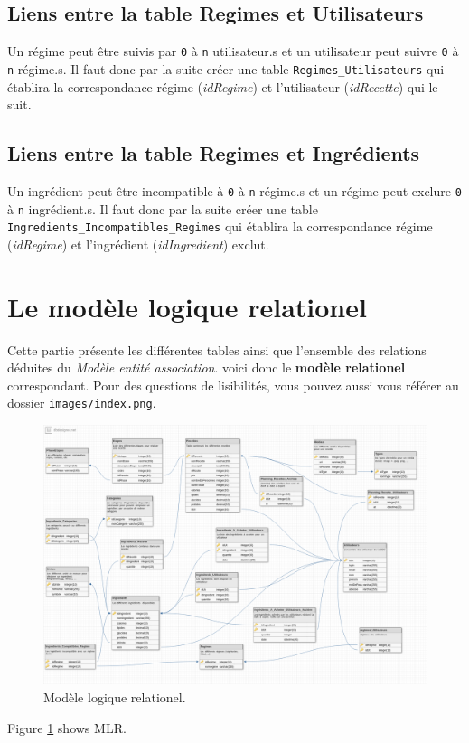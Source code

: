 \subsection{Liens entre la table Regimes et Utilisateurs}
Un régime peut être suivis par \texttt{0} à \texttt{n} utilisateur.s et un utilisateur peut suivre \texttt{0} à \texttt{n} régime.s. Il faut donc par la suite créer une table \texttt{Regimes\_Utilisateurs} qui établira la correspondance régime (\textit{idRegime}) et l'utilisateur (\textit{idRecette}) qui le suit.

\subsection{Liens entre la table Regimes et Ingrédients}
Un ingrédient peut être incompatible à \texttt{0} à \texttt{n} régime.s et un régime peut exclure \texttt{0} à \texttt{n} ingrédient.s. Il faut donc par la suite créer une table \texttt{Ingredients\_Incompatibles\_Regimes} qui établira la correspondance régime (\textit{idRegime}) et l'ingrédient (\textit{idIngredient}) exclut.

\section{Le modèle logique relationel}
Cette partie présente les différentes tables ainsi que l'ensemble des relations déduites du \textit{Modèle entité association}. voici donc le \textbf{modèle relationel} correspondant. Pour des questions de lisibilités, vous pouvez aussi vous référer au dossier \texttt{images/index.png}.

\begin{figure}
    \includegraphics[scale=0.3]{images/index.png}
    \caption{Modèle logique relationel.}
    \label{fig:modele E/R}
\end{figure}
Figure \ref{fig:modele E/R} shows MLR.